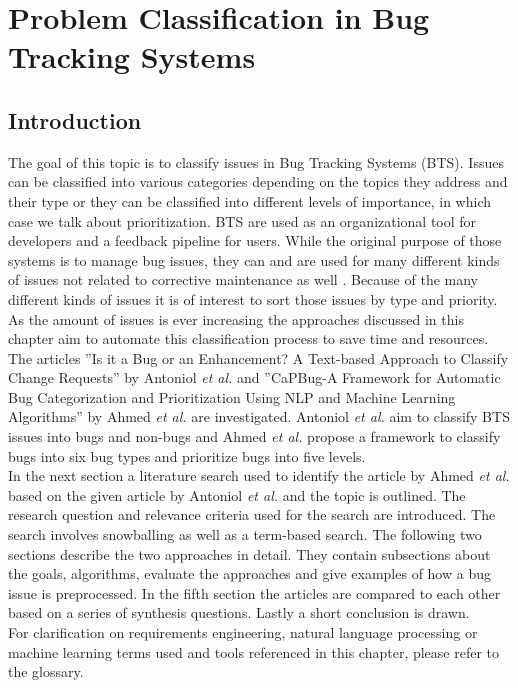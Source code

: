 \chapter{Problem Classification in Bug Tracking Systems}

\section{Introduction}

The goal of this topic is to classify issues in Bug Tracking Systems (BTS). Issues can be classified into various categories depending on the topics they address and their type or they can be classified into different levels of importance, in which case we talk about prioritization. BTS are used as an organizational tool for developers and a feedback pipeline for users. While the original purpose of those systems is to manage bug issues, they can and are used for many different kinds of issues not related to corrective maintenance as well \cite{Antoniol2008}. Because of the many different kinds of issues it is of interest to sort those issues by type and priority. As the amount of issues is ever increasing the approaches discussed in this chapter aim to automate this classification process to save time and resources.\\
The articles ''Is it a Bug or an Enhancement? A Text-based Approach to Classify Change Requests'' by Antoniol \textit{et al.} \cite{Antoniol2008} and ''CaPBug-A Framework for Automatic Bug Categorization and Prioritization Using NLP and Machine Learning Algorithms'' by Ahmed \textit{et al.} \cite{Ahmed2021} are investigated. Antoniol \textit{et al.} aim to classify BTS issues into bugs and non-bugs and Ahmed \textit{et al.} propose a framework to classify bugs into six bug types and prioritize bugs into five levels.\\
In the next section a literature search used to identify the article by Ahmed \textit{et al.} based on the given article by Antoniol \textit{et al.} and the topic is outlined. The research question and relevance criteria used for the search are introduced. The search involves snowballing as well as a term-based search. The following two sections describe the two approaches in detail. They contain subsections about the goals, algorithms, evaluate the approaches and give examples of how a bug issue is preprocessed. In the fifth section the articles are compared to each other based on a series of synthesis questions. Lastly a short conclusion is drawn.\\
For clarification on requirements engineering, natural language processing or machine learning terms used and tools referenced in this chapter, please refer to the glossary.

